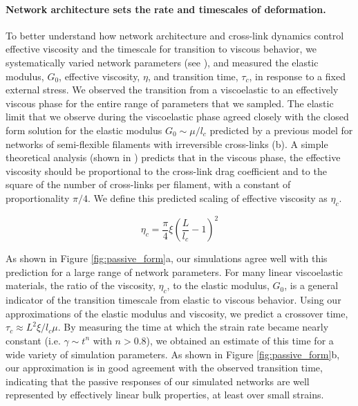\documentclass[10pt,letterpaper]{article}
\begin{document}
\paragraph{Network architecture sets the rate and timescales of deformation.}  To better understand how network architecture and cross-link dynamics control effective viscosity and the timescale for transition to viscous behavior, we systematically varied network parameters (see ), and measured the elastic modulus, $G_0$, effective viscosity, $\eta$, and transition time, $\tau_c$, in response to a fixed external stress. We observed the transition from a viscoelastic to an effectively viscous phase for the entire range of parameters that we sampled.  The elastic limit that we observe during the viscoelastic phase agreed closely with the closed form solution for the elastic modulus  $G_0 \sim \mu/l_c$ predicted by a previous model \cite{theo_hlm} for networks of semi-flexible filaments with irreversible cross-links (b). A simple theoretical analysis (shown in ) predicts that in the viscous phase, the effective viscosity should be proportional to the cross-link drag coefficient and to the square of the number of cross-links per filament, with a constant of proportionality $\pi/4$. We define this predicted scaling of effective viscosity as $\eta_c$.

\begin{equation}
\eta_c = \frac{\pi}{4}\xi\left ( \frac{L}{l_c}-1\right )^2
\end{equation}


As shown in Figure \ref{fig:passive_form}a, our simulations agree well with this prediction for a large range of network parameters. For many linear viscoelastic materials, the ratio of the viscosity, $\eta_c$, to the elastic modulus, $G_0$, is a general indicator of the transition timescale from elastic to viscous behavior\cite{mccrum1997principles}. Using our approximations of the elastic modulus and viscosity, we predict a crossover time, $\tau_c \approx L^2\xi/l_c\mu$. By measuring the time at which the strain rate became nearly constant (i.e. $\gamma \sim t^n$ with $n>0.8$), we obtained an estimate of this time for a wide variety of simulation parameters. As shown in Figure \ref{fig:passive_form}b, our approximation is in good agreement with the observed transition time, indicating that the passive responses of our simulated networks are well represented by effectively linear bulk properties, at least over small strains.
\end{document}
